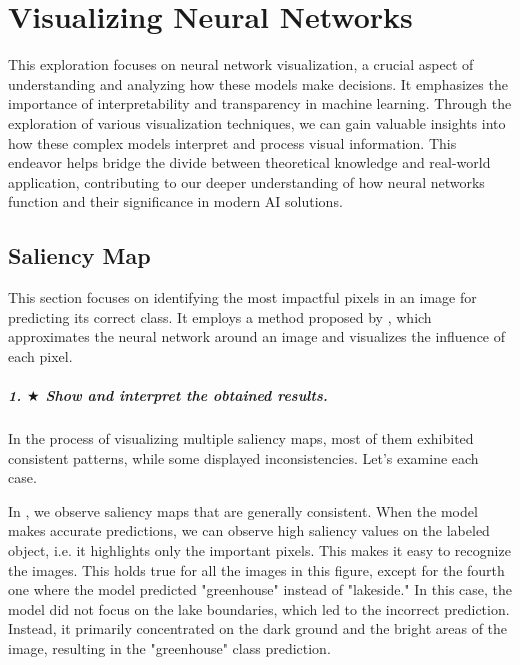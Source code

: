\chapter{Visualizing Neural Networks}
\graphicspath{{figs/2b/}}

This exploration focuses on neural network visualization, a crucial aspect of understanding and analyzing how these models make decisions. It emphasizes the importance of interpretability and transparency in machine learning. Through the exploration of various visualization techniques, we can gain valuable insights into how these complex models interpret and process visual information. This endeavor helps bridge the divide between theoretical knowledge and real-world application, contributing to our deeper understanding of how neural networks function and their significance in modern AI solutions.

\section{Saliency Map}

This section focuses on identifying the most impactful pixels in an image for predicting its correct class. It employs a method proposed by \cite{simonyan2014deep}, which approximates the neural network around an image and visualizes the influence of each pixel.

\paragraph*{1. $ \bigstar $ Show and interpret the obtained results.}
In the process of visualizing multiple saliency maps, most of them exhibited consistent patterns, while some displayed inconsistencies. Let's examine each case.


In , we observe saliency maps that are generally consistent. When the model makes accurate predictions, we can observe high saliency values on the labeled object, i.e. it highlights only the important pixels. This makes it easy to recognize the images. This holds true for all the images in this figure, except for the fourth one where the model predicted "greenhouse" instead of "lakeside." In this case, the model did not focus on the lake boundaries, which led to the incorrect prediction. Instead, it primarily concentrated on the dark ground and the bright areas of the image, resulting in the "greenhouse" class prediction. 

